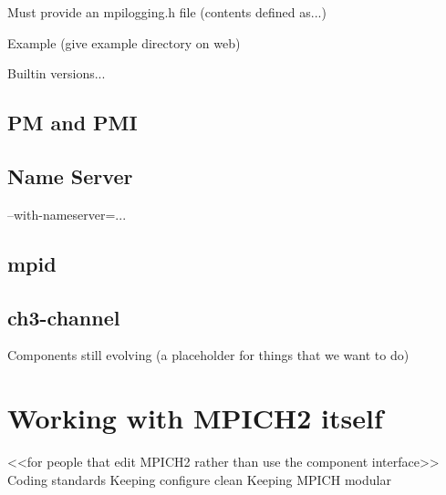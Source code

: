 \documentclass{report}
\begin{document}
    Must provide an mpilogging.h file (contents defined as...)

    Example (give example directory on web)

    Builtin versions...

\section{PM and PMI}
\section{Name Server}

    --with-nameserver=...

\section{mpid}
\section{ch3-channel}

          Components still evolving (a placeholder for things that we want to do)

\chapter{Working with MPICH2 itself}
          <<for people that edit MPICH2 rather than use the component interface>>
          Coding standards
          Keeping configure clean
          Keeping MPICH modular
          
\end{document}
